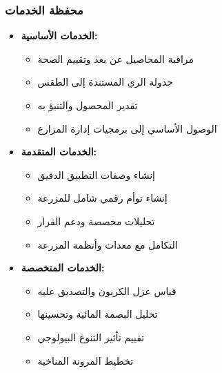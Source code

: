 \subsubsection{محفظة الخدمات}
\begin{itemize}
    \item \textbf{الخدمات الأساسية:}
    \begin{itemize}
        \item مراقبة المحاصيل عن بعد وتقييم الصحة
        \item جدولة الري المستندة إلى الطقس
        \item تقدير المحصول والتنبؤ به
        \item الوصول الأساسي إلى برمجيات إدارة المزارع
    \end{itemize}
    
    \item \textbf{الخدمات المتقدمة:}
    \begin{itemize}
        \item إنشاء وصفات التطبيق الدقيق
        \item إنشاء توأم رقمي شامل للمزرعة
        \item تحليلات مخصصة ودعم القرار
        \item التكامل مع معدات وأنظمة المزرعة
    \end{itemize}
    
    \item \textbf{الخدمات المتخصصة:}
    \begin{itemize}
        \item قياس عزل الكربون والتصديق عليه
        \item تحليل البصمة المائية وتحسينها
        \item تقييم تأثير التنوع البيولوجي
        \item تخطيط المرونة المناخية
    \end{itemize}
\end{itemize}

